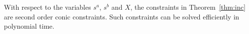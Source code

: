 With respect to the
variables $s^a$, $s^b$ and $X$, the constraints in
Theorem~\ref{thm:inc} are second order conic constraints.  Such
constraints can be solved efficiently in polynomial time.


